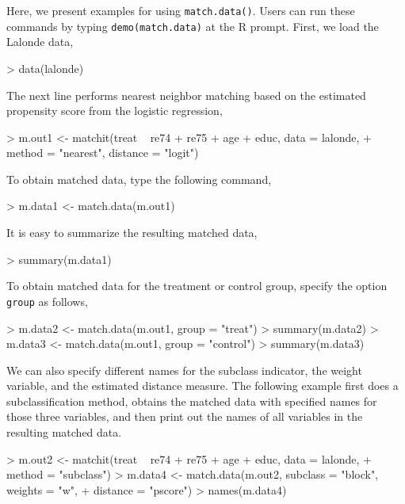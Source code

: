 \documentclass[oneside,letterpaper,titlepage]{article}
\begin{document}
Here, we present examples for using {\tt match.data()}. Users can run
these commands by typing {\tt demo(match.data)} at the R
prompt. First, we load the Lalonde data,
\begin{Schunk}
\begin{Sinput}
> data(lalonde)
\end{Sinput}
\end{Schunk}
The next line performs nearest neighbor matching based on the
estimated propensity score from the logistic regression,
\begin{Schunk}
\begin{Sinput}
> m.out1 <- matchit(treat ~ re74 + re75 + age + educ, data = lalonde, 
+     method = "nearest", distance = "logit")
\end{Sinput}
\end{Schunk}
To obtain matched data, type the following command, 
\begin{Schunk}
\begin{Sinput}
> m.data1 <- match.data(m.out1)
\end{Sinput}
\end{Schunk}
It is easy to summarize the resulting matched data,
\begin{Schunk}
\begin{Sinput}
> summary(m.data1)
\end{Sinput}
\end{Schunk}
To obtain matched data for the treatment or control group, specify the option
{\tt group} as follows,
\begin{Schunk}
\begin{Sinput}
> m.data2 <- match.data(m.out1, group = "treat")
> summary(m.data2)
> m.data3 <- match.data(m.out1, group = "control")
> summary(m.data3)
\end{Sinput}
\end{Schunk}
We can also specify different names for the subclass indicator, the
weight variable, and the estimated distance measure. The following
example first does a subclassification method, obtains the
matched data with specified names for those three variables, and then
print out the names of all variables in the resulting matched data.
\begin{Schunk}
\begin{Sinput}
> m.out2 <- matchit(treat ~ re74 + re75 + age + educ, data = lalonde, 
+     method = "subclass")
> m.data4 <- match.data(m.out2, subclass = "block", weights = "w", 
+     distance = "pscore")
> names(m.data4)
\end{Sinput}
\end{Schunk}
\end{document}
